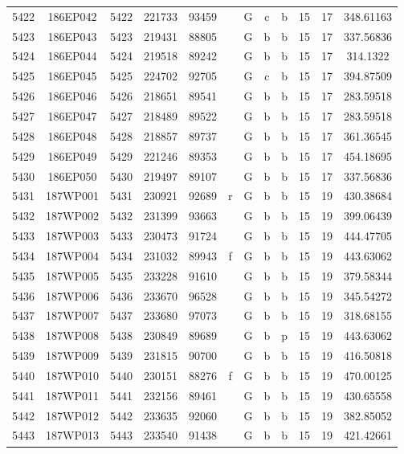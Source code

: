\begin{tabular}{|*{12}{c|}}
5422 & 186EP042 & 5422 & 221733 & 93459 &  & G & c & b & 15 & 17 & 348.61163 \\ 
5423 & 186EP043 & 5423 & 219431 & 88805 &  & G & b & b & 15 & 17 & 337.56836 \\ 
5424 & 186EP044 & 5424 & 219518 & 89242 &  & G & b & b & 15 & 17 & 314.1322 \\ 
5425 & 186EP045 & 5425 & 224702 & 92705 &  & G & c & b & 15 & 17 & 394.87509 \\ 
5426 & 186EP046 & 5426 & 218651 & 89541 &  & G & b & b & 15 & 17 & 283.59518 \\ 
5427 & 186EP047 & 5427 & 218489 & 89522 &  & G & b & b & 15 & 17 & 283.59518 \\ 
5428 & 186EP048 & 5428 & 218857 & 89737 &  & G & b & b & 15 & 17 & 361.36545 \\ 
5429 & 186EP049 & 5429 & 221246 & 89353 &  & G & b & b & 15 & 17 & 454.18695 \\ 
5430 & 186EP050 & 5430 & 219497 & 89107 &  & G & b & b & 15 & 17 & 337.56836 \\ 
5431 & 187WP001 & 5431 & 230921 & 92689 & r & G & b & b & 15 & 19 & 430.38684 \\ 
5432 & 187WP002 & 5432 & 231399 & 93663 &  & G & b & b & 15 & 19 & 399.06439 \\ 
5433 & 187WP003 & 5433 & 230473 & 91724 &  & G & b & b & 15 & 19 & 444.47705 \\ 
5434 & 187WP004 & 5434 & 231032 & 89943 & f & G & b & b & 15 & 19 & 443.63062 \\ 
5435 & 187WP005 & 5435 & 233228 & 91610 &  & G & b & b & 15 & 19 & 379.58344 \\ 
5436 & 187WP006 & 5436 & 233670 & 96528 &  & G & b & b & 15 & 19 & 345.54272 \\ 
5437 & 187WP007 & 5437 & 233680 & 97073 &  & G & b & b & 15 & 19 & 318.68155 \\ 
5438 & 187WP008 & 5438 & 230849 & 89689 &  & G & b & p & 15 & 19 & 443.63062 \\ 
5439 & 187WP009 & 5439 & 231815 & 90700 &  & G & b & b & 15 & 19 & 416.50818 \\ 
5440 & 187WP010 & 5440 & 230151 & 88276 & f & G & b & b & 15 & 19 & 470.00125 \\ 
5441 & 187WP011 & 5441 & 232156 & 89461 &  & G & b & b & 15 & 19 & 430.65558 \\ 
5442 & 187WP012 & 5442 & 233635 & 92060 &  & G & b & b & 15 & 19 & 382.85052 \\ 
5443 & 187WP013 & 5443 & 233540 & 91438 &  & G & b & b & 15 & 19 & 421.42661 \\ 

\end{tabular}
